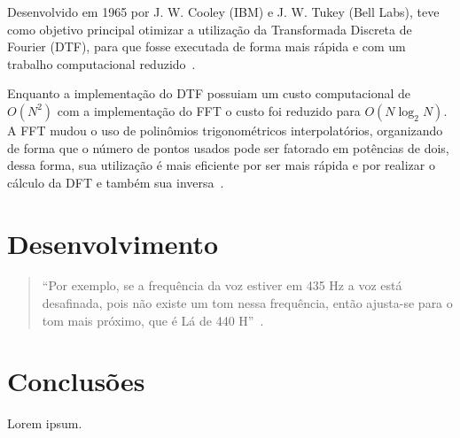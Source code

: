 \documentclass{sbrt}
\begin{document}
Desenvolvido em 1965 por  J. W. Cooley (IBM) e J. W. Tukey (Bell Labs), teve como objetivo principal otimizar a utilização da Transformada Discreta de Fourier (DTF), para que fosse executada de forma mais rápida e com um trabalho computacional reduzido~\cite{martins2016analise}.

Enquanto a implementação do DTF possuiam um custo computacional de $O(N^2)$ com a implementação do FFT o custo foi reduzido para $O(N \log_2{N})$. A FFT mudou o uso de polinômios trigonométricos interpolatórios, organizando de forma que o número de pontos usados pode ser fatorado em potências de dois, dessa forma, sua utilização é mais eficiente por ser mais rápida e por realizar o cálculo da DFT e também sua inversa~\cite{reis2008implementaccao}.


\section{Desenvolvimento}

\begin{quote}
  ``Por exemplo, se a frequência da voz estiver em 435 Hz a voz está desafinada, pois não existe um tom nessa frequência, então ajusta-se para o tom mais próximo, que é Lá de 440 H''~\cite{deimplementaccao}.
\end{quote}


\section{Conclusões}

Lorem ipsum.





\end{document}
